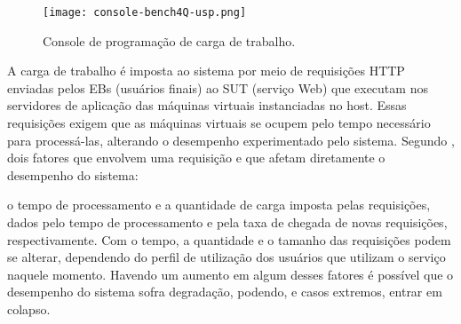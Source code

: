 \begin{figure}[htb]
	\centering
	\texttt{[image: console-bench4Q-usp.png]}
	\caption{Console de programação de carga de trabalho.}
	\label{fig:interface-criada-beanch4q}
	\fautor
\end{figure}


A carga de trabalho é imposta ao sistema por meio de requisições HTTP enviadas pelos EBs (usuários finais) ao SUT (serviço Web) que executam nos servidores de aplicação das máquinas virtuais instanciadas no host. Essas requisições exigem que as máquinas virtuais se ocupem pelo tempo necessário para processá-las, alterando o desempenho experimentado pelo sistema.
Segundo \cite{Nobile2013}, dois fatores que envolvem uma requisição e que afetam diretamente o desempenho do sistema:
\begin{citacao}
	o tempo de processamento e a quantidade de carga imposta pelas requisições, dados pelo tempo de processamento e pela taxa de chegada de novas requisições, respectivamente. Com o tempo, a quantidade e o tamanho das requisições podem se alterar, dependendo do perfil de utilização dos usuários que utilizam o serviço naquele momento. Havendo um aumento em algum desses fatores é possível que o desempenho do sistema sofra degradação, podendo, e casos extremos, entrar em colapso.
\end{citacao}



